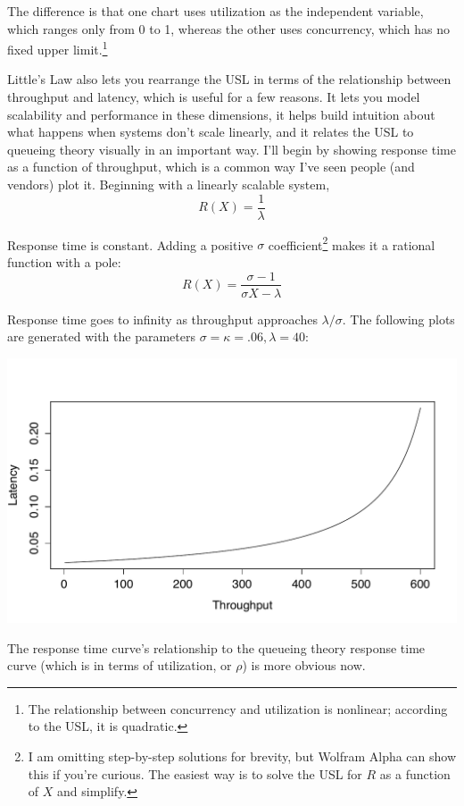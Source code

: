 \documentclass{vivid_layout}
\begin{document}
The difference is that one chart uses utilization as the independent variable,
which ranges only from 0 to 1, whereas the other uses concurrency, which has no
fixed upper limit.\footnote{The relationship between concurrency and utilization
is nonlinear; according to the USL, it is quadratic.}

Little's Law also lets you rearrange the USL in terms of the relationship
between throughput and latency, which is useful for a few reasons. It lets you
model scalability and performance in these dimensions, it helps build intuition
about what happens when systems don't scale linearly,  and it relates the USL to
queueing theory visually in an important way.
I'll begin by showing response time as a function of throughput, which is a
common way I've seen people (and vendors) plot it. Beginning with a linearly
scalable system,
\[
R(X) = \frac{1}{\lambda}
\]

Response time is constant. Adding a positive $\sigma$ coefficient\footnote{I am
omitting step-by-step solutions for brevity, but Wolfram Alpha can show this if
you're curious. The easiest way is to solve the USL for $R$ as a function of
$X$ and simplify.} makes it a rational function with a pole:
\begin{equation}
R(X) = \frac{\sigma - 1}{\sigma X - \lambda}
\label{amdahl_r_x}
\end{equation}

Response time goes to infinity as throughput approaches $\lambda/\sigma$. The
following plots are generated with the parameters $\sigma=\kappa=.06,
\lambda=40$:
\begin{center}
\includegraphics[width=.85\linewidth]{scalability/r-function-x-amdahl}
\end{center}

The response time curve's relationship to the queueing theory response time
curve (which is in terms of utilization, or $\rho$) is more obvious now.
\end{document}
